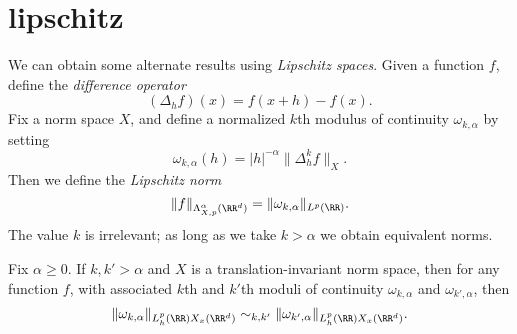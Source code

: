 \section{lipschitz}

We can obtain some alternate results using \emph{Lipschitz spaces}. Given a function $f$, define the \emph{difference operator}
%
\[ (\Delta_h f)(x) = f(x + h) - f(x). \]
%
Fix a norm space $X$, and define a normalized $k$th modulus of continuity $\omega_{k,\alpha}$ by setting
%
\[ \omega_{k,\alpha}(h) = |h|^{-\alpha} \| \Delta^k_h f \|_X. \]
%
Then we define the \emph{Lipschitz norm}
%
\[ \| f \|_{\Lambda^\alpha_{X,p}(\RR^d)} = \| \omega_{k,\alpha} \|_{L^p(\RR)}. \]
%
The value $k$ is irrelevant; as long as we take $k > \alpha$ we obtain equivalent norms.

\begin{lemma}
    Fix $\alpha \geq 0$. If $k,k' > \alpha$ and $X$ is a translation-invariant norm space, then for any function $f$, with associated $k$th and $k'$th moduli of continuity $\omega_{k,\alpha}$ and $\omega_{k',\alpha}$, then
    \[ \| \omega_{k,\alpha} \|_{L^p_h(\RR) X_x(\RR^d)} \sim_{k,k'} \| \omega_{k',\alpha} \|_{L^p_h(\RR) X_x(\RR^d)}. \]
\end{lemma}
